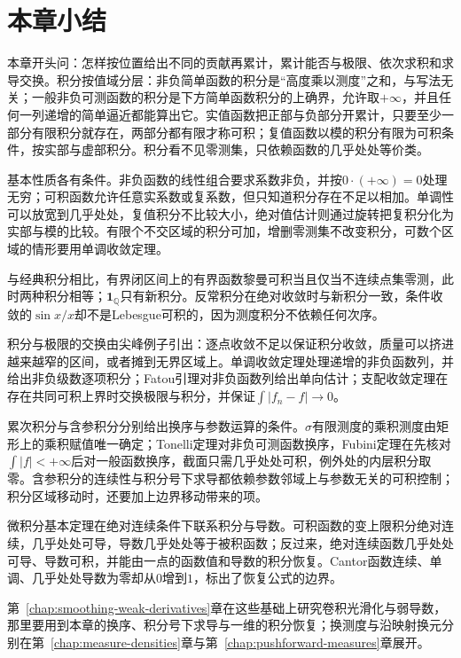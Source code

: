 \section{本章小结}
\label{sec:integ-summary}

本章开头问：怎样按位置给出不同的贡献再累计，累计能否与极限、依次求积和求导交换。积分按值域分层：非负简单函数的积分是“高度乘以测度”之和，与写法无关；一般非负可测函数的积分是下方简单函数积分的上确界，允许取$+\infty$，并且任何一列递增的简单逼近都能算出它。实值函数把正部与负部分开累计，只要至少一部分有限积分就存在，两部分都有限才称可积；复值函数以模的积分有限为可积条件，按实部与虚部积分。积分看不见零测集，只依赖函数的几乎处处等价类。

基本性质各有条件。非负函数的线性组合要求系数非负，并按$0\cdot(+\infty)=0$处理无穷；可积函数允许任意实系数或复系数，但只知道积分存在不足以相加。单调性可以放宽到几乎处处，复值积分不比较大小，绝对值估计则通过旋转把复积分化为实部与模的比较。有限个不交区域的积分可加，增删零测集不改变积分，可数个区域的情形要用单调收敛定理。

与经典积分相比，有界闭区间上的有界函数黎曼可积当且仅当不连续点集零测，此时两种积分相等；$\mathbf 1_{\mathbb Q}$只有新积分。反常积分在绝对收敛时与新积分一致，条件收敛的$\sin x/x$却不是Lebesgue可积的，因为测度积分不依赖任何次序。

积分与极限的交换由尖峰例子引出：逐点收敛不足以保证积分收敛，质量可以挤进越来越窄的区间，或者摊到无界区域上。单调收敛定理处理递增的非负函数列，并给出非负级数逐项积分；Fatou引理对非负函数列给出单向估计；支配收敛定理在存在共同可积上界时交换极限与积分，并保证$\int\lvert f_n-f\rvert\to0$。

累次积分与含参积分分别给出换序与参数运算的条件。$\sigma$有限测度的乘积测度由矩形上的乘积赋值唯一确定；Tonelli定理对非负可测函数换序，Fubini定理在先核对$\int\lvert f\rvert<+\infty$后对一般函数换序，截面只需几乎处处可积，例外处的内层积分取零。含参积分的连续性与积分号下求导都依赖参数邻域上与参数无关的可积控制；积分区域移动时，还要加上边界移动带来的项。

微积分基本定理在绝对连续条件下联系积分与导数。可积函数的变上限积分绝对连续，几乎处处可导，导数几乎处处等于被积函数；反过来，绝对连续函数几乎处处可导、导数可积，并能由一点的函数值和导数的积分恢复。Cantor函数连续、单调、几乎处处导数为零却从$0$增到$1$，标出了恢复公式的边界。

第~\ref{chap:smoothing-weak-derivatives}章在这些基础上研究卷积光滑化与弱导数，那里要用到本章的换序、积分号下求导与一维的积分恢复；换测度与沿映射换元分别在第~\ref{chap:measure-densities}章与第~\ref{chap:pushforward-measures}章展开。
